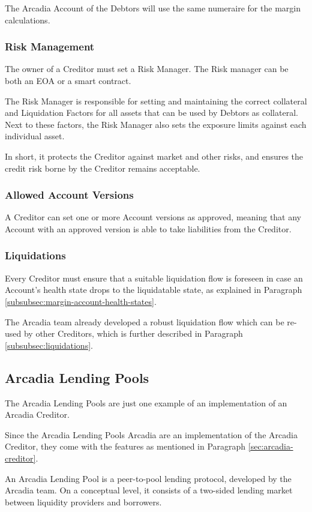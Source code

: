 \documentclass[sigconf,nonacm]{acmart}
\begin{document}
The Arcadia Account of the Debtors will use the same numeraire for the margin calculations.

\subsubsection{Risk Management}
The owner of a Creditor must set a Risk Manager.
The Risk manager can be both an EOA or a smart contract.

The Risk Manager is responsible for setting and maintaining the correct collateral and Liquidation Factors for all assets that can be used by Debtors as collateral.
Next to these factors, the Risk Manager also sets the exposure limits against each individual asset. 

In short, it protects the Creditor against market and other risks, and ensures the credit risk borne by the Creditor remains acceptable.

\subsubsection{Allowed Account Versions}
A Creditor can set one or more Account versions as approved,
meaning that any Account with an approved version is able to take liabilities from the Creditor.

\subsubsection{Liquidations}
Every Creditor must ensure that a suitable liquidation flow is foreseen in case an Account's health state drops to the liquidatable state,
as explained in Paragraph \ref{subsubsec:margin-account-health-states}.

The Arcadia team already developed a robust liquidation flow which can be re-used by other Creditors,
which is further described in Paragraph \ref{subsubsec:liquidations}.

\subsection{Arcadia Lending Pools}
The Arcadia Lending Pools are just one example of an implementation of an Arcadia Creditor.

Since the Arcadia Lending Pools Arcadia are an implementation of the Arcadia Creditor,
they come with the features as mentioned in Paragraph \ref{sec:arcadia-creditor}.

An Arcadia Lending Pool is a peer-to-pool lending protocol, developed by the Arcadia team.
On a conceptual level, it consists of a two-sided lending market between liquidity providers and borrowers.
\end{document}
